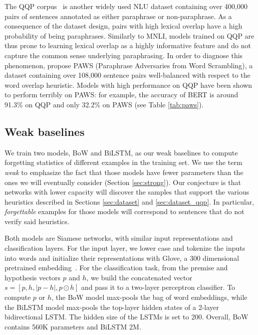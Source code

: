 The QQP corpus~\citep{qqp} is another widely used NLU dataset containing over 400,000 pairs of sentences annotated as either paraphrase or non-paraphrase. As a consequence of the dataset design, pairs with high lexical overlap have a high probability of being paraphrases. Similarly to MNLI, models trained on QQP are thus prone to learning lexical overlap as a highly informative feature and do not capture the common sense underlying paraphrasing. In order to diagnose this phenomenon, \citet{zhang-etal-2019-paws} propose PAWS (Paraphrase Adversaries from Word Scrambling), a dataset containing over 108,000 sentence pairs well-balanced with respect to the word overlap heuristic. Models with high performance on QQP have been shown to perform terribly on PAWS: for example, the accuracy of BERT is around 91.3\% on QQP and only 32.2\% on PAWS (see Table \ref{tab:paws}).

\subsection{Weak baselines}

We train two models, BoW and BiLSTM, as our weak baselines to compute forgetting statistics of different examples in the training set. We use the term \textit{weak} to emphasize the fact that those models have fewer parameters than the ones we will eventually consider (Section \ref{sec:strong}). Our conjecture is that networks with lower capacity will discover the samples that support the various heuristics described in Sections \ref{sec:dataset} and  \ref{sec:dataset_qqp}. In particular, \emph{forgettable} examples for those models will correspond to sentences that do not verify said heuristics.

Both models are Siamese networks, with similar input representations and classification layers.
For the input layer, we lower case and tokenize the inputs into words and initialize their representations with Glove, a 300 dimensional pretrained embedding~\citep{pennington2014glove}.
For the classification task, from the premise and hypothesis vectors $p$ and $h$, we build the concatenated vector $s = [p, h, |p - h|, p \odot h]$ and pass it to a two-layer perceptron classifier. 
To compute $p$ or $h$, the BoW model max-pools the bag of word embeddings,
while the BiLSTM model max-pools the top-layer hidden states of a 2-layer bidirectional LSTM. The hidden size of the LSTMs is set to 200. Overall, BoW contains 560K parameters and BiLSTM 2M.

